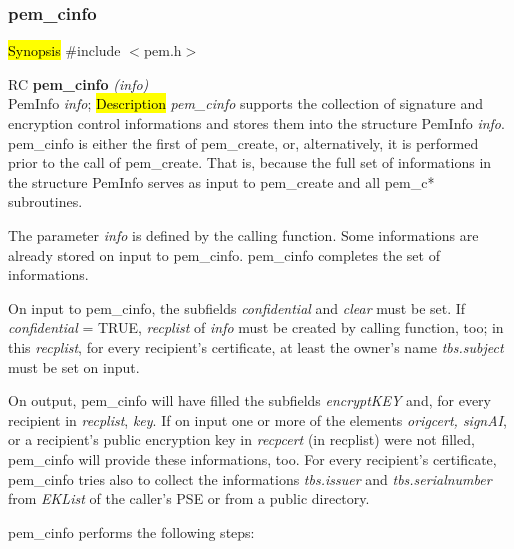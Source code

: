 \subsubsection{pem\_cinfo}
\label{pem_cinfo}
\hl{Synopsis}
\#include $<$pem.h$>$ 

RC {\bf pem\_cinfo} {\em (info)} \\
PemInfo {\em *info};
\hl{Description}
{\em pem\_cinfo} supports the collection of signature and
encryption control informations and stores them into
the structure PemInfo {\em info}.
pem\_cinfo is either the first of pem\_create,
or, alternatively, it is performed prior to the call of pem\_create.
That is, because the full set of informations in the structure PemInfo
serves as input to pem\_create and all pem\_c* subroutines.


The parameter {\em info} is defined by the calling function.
Some informations are already stored on input to pem\_cinfo.
pem\_cinfo completes the set of informations.


On input to pem\_cinfo, the subfields {\em confidential} and {\em clear}
must be set. If {\em confidential} = TRUE,
{\em recplist} of {\em info} must be created by calling function, too;
in this {\em recplist},
for every recipient's certificate, at least
the owner's name {\em tbs.subject} must be set on input.


On output, pem\_cinfo will have filled the subfields
{\em encryptKEY} and,  for every recipient in {\em recplist}, {\em key}.
If on input one or more of the elements
{\em origcert, signAI}, or a recipient's public encryption key
in {\em recpcert} (in recplist) were not filled,
pem\_cinfo will provide these informations, too.
For every recipient's certificate, pem\_cinfo tries also to collect the
informations {\em tbs.issuer} and {\em tbs.serialnumber}
from {\em EKList} of the caller's PSE or from a public directory.


pem\_cinfo performs the following steps:

